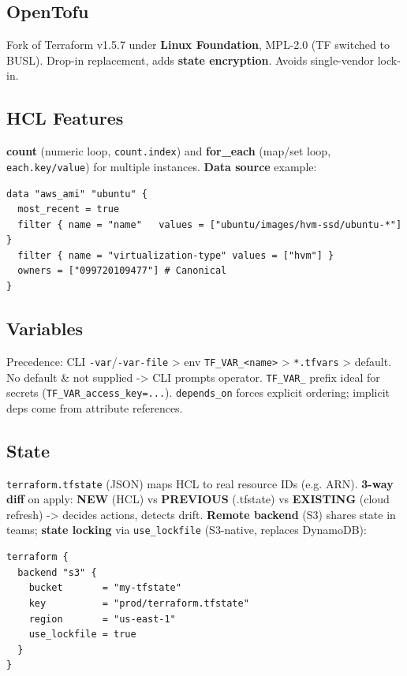 \subsection{OpenTofu}
Fork of Terraform v1.5.7 under \textbf{Linux Foundation}, MPL-2.0 (TF switched to BUSL). Drop-in replacement, adds \textbf{state encryption}. Avoids single-vendor lock-in.
\subsection{HCL Features}
\textbf{count} (numeric loop, \texttt{count.index}) and \textbf{for\_each} (map/set loop, \texttt{each.key/value}) for multiple instances. \textbf{Data source} example:
\begin{lstlisting}[language=hcl]
data "aws_ami" "ubuntu" {
  most_recent = true
  filter { name = "name"   values = ["ubuntu/images/hvm-ssd/ubuntu-*"] }
  filter { name = "virtualization-type" values = ["hvm"] }
  owners = ["099720109477"] # Canonical
}
\end{lstlisting}
\subsection{Variables}
Precedence: CLI \texttt{-var}/\texttt{-var-file} > env \texttt{TF\_VAR\_<name>} > \texttt{*.tfvars} > default. No default \& not supplied -> CLI prompts operator. \texttt{TF\_VAR\_} prefix ideal for secrets (\texttt{TF\_VAR\_access\_key=...}). \texttt{depends\_on} forces explicit ordering; implicit deps come from attribute references.
\subsection{State}
\texttt{terraform.tfstate} (JSON) maps HCL to real resource IDs (e.g. ARN). \textbf{3-way diff} on apply: \textbf{NEW} (HCL) vs \textbf{PREVIOUS} (.tfstate) vs \textbf{EXISTING} (cloud refresh) -> decides actions, detects drift. \textbf{Remote backend} (S3) shares state in teams; \textbf{state locking} via \texttt{use\_lockfile} (S3-native, replaces DynamoDB):
\begin{lstlisting}[language=hcl]
terraform {
  backend "s3" {
    bucket       = "my-tfstate"
    key          = "prod/terraform.tfstate"
    region       = "us-east-1"
    use_lockfile = true
  }
}
\end{lstlisting}
